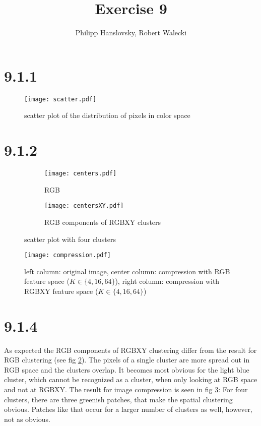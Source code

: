 \documentclass[a4paper,11pt]{article}
\title{Exercise 9}
\author{Philipp Hanslovsky, Robert Walecki}
\theoremstyle{definition}
\theoremstyle{plain}
\theoremstyle{remark}
\begin{document}


\maketitle

\section*{9.1.1}
\begin{figure}[H]
\centering
\texttt{[image: scatter.pdf]}
\caption{scatter plot of the distribution of pixels in color space}
\label{fig:scat}
\end{figure}

\section*{9.1.2}
\begin{figure}[H]
\centering
\begin{subfigure}{0.45\textwidth}
\texttt{[image: centers.pdf]}
\caption{RGB}
\end{subfigure}
\hfill
\begin{subfigure}{0.45\textwidth}
\texttt{[image: centersXY.pdf]}
\caption{RGB components of RGBXY clusters}
\end{subfigure}
\caption{scatter plot with four clusters}
\label{fig:clus}
\end{figure}

\begin{figure}[H]
\centering
\texttt{[image: compression.pdf]}
\caption{left column: original image, center column: compression with RGB feature space ($K\in\{4,16,64\}$), right column: compression with RGBXY feature space ($K\in\{4,16,64\}$)}
\label{fig:compress}
\end{figure}

\section*{9.1.4}
As expected the RGB components of RGBXY clustering differ from the result for RGB clustering (see fig \ref{fig:clus}). The pixels of a single cluster are more spread out in RGB space and the clusters overlap. It becomes most obvious for the light blue cluster, which cannot be recognized as a cluster, when only looking at RGB space and not at RGBXY. The result for image compression is seen in fig \ref{fig:compress}: For four clusters, there are three greenish patches, that make the spatial clustering obvious. Patches like that occur for a larger number of clusters as well, however, not as obvious.
\end{document}
